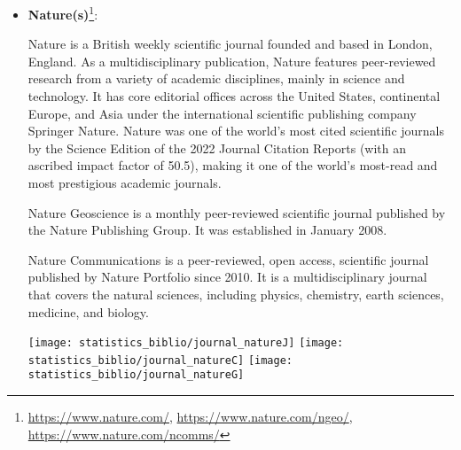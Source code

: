 \begin{itemize}
\item {\bf Nature(s)}\footnote{
\url{https://www.nature.com/},
\url{https://www.nature.com/ngeo/},
\url{https://www.nature.com/ncomms/}
}:

Nature is a British weekly scientific journal founded and based in London, England. 
As a multidisciplinary publication, Nature features peer-reviewed research from a variety of 
academic disciplines, mainly in science and technology. It has core editorial offices across the 
United States, continental Europe, and Asia under the international scientific publishing company 
Springer Nature. Nature was one of the world's most cited scientific journals by the Science Edition 
of the 2022 Journal Citation Reports (with an ascribed impact factor of 50.5), making it one of the world's most-read and most prestigious academic journals.

Nature Geoscience is a monthly peer-reviewed scientific journal published by the Nature Publishing Group. 
It was established in January 2008. 

Nature Communications is a peer-reviewed, open access, scientific journal published by Nature Portfolio since 2010. 
It is a multidisciplinary journal that covers the natural sciences, including physics, chemistry, earth sciences, 
medicine, and biology.

\begin{center}
\texttt{[image: statistics\_biblio/journal\_natureJ]}
\texttt{[image: statistics\_biblio/journal\_natureC]}
\texttt{[image: statistics\_biblio/journal\_natureG]}
\end{center}

\end{itemize}




